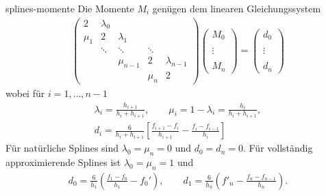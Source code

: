 \begin{Lemma}{splines-momente}
  Die Momente $M_i$ genügen dem linearen Gleichungssystem
  \begin{gather}
    \begin{pmatrix}
      2 & \lambda_0 \\
      \mu_1 & 2 & \lambda_1\\
      & \ddots & \ddots & \ddots \\
      && \mu_{n-1} & 2 & \lambda_{n-1}\\
      &&&\mu_n & 2
    \end{pmatrix}
    \begin{pmatrix}
      M_0\\\\\vdots\\\\M_n
    \end{pmatrix}
    =
    \begin{pmatrix}
      d_0\\\\\vdots\\\\d_n
    \end{pmatrix}
  \end{gather}
  wobei für $i=1,\dots,n-1$
  \begin{gather}
    \lambda_i = \tfrac{h_{i+1}}{h_{i}+h_{i+1}},
    \qquad \mu_i = 1-\lambda_i = \tfrac{h_{i}}{h_{i}+h_{i+1}},\\
    d_i = \tfrac{6}{h_{i}+h_{i+1}}
    \left[\tfrac{f_{i+1}-f_i}{h_{i+1}} - \tfrac{f_{i}-f_{i-1}}{h_{i}}\right]
  \end{gather}
  Für natürliche Splines sind $\lambda_0 = \mu_n =0$ und $d_0 = d_n = 0$.
  Für vollständig approximierende Splines ist $\lambda_0 = \mu_n = 1$ und
  \begin{gather}
    d_0 = \frac{6}{h_1}\left(\frac{f_1-f_0}{h_1}-f_0'\right),
    \qquad
    d_1 = \frac{6}{h_n}\left(f'_n - \frac{f_n-f_{n-1}}{h_n}\right).
  \end{gather}
\end{Lemma}

